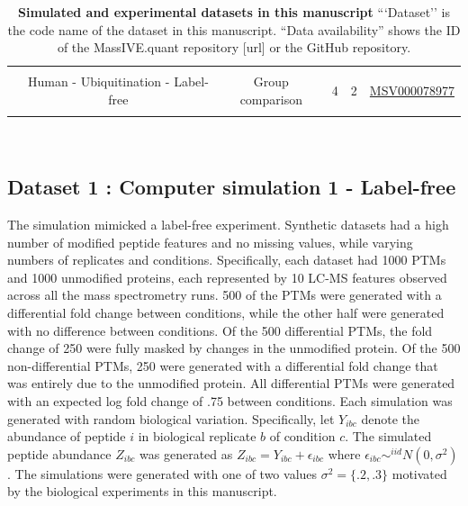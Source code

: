 \documentclass[mcp]{article}
\numberwithin{table}{section}
\def\todo#1{{\color{red}[#1]}}
\begin{document}
\begin{table}[h!]
\begin{tiny}
\begin{tabular}{|c|c|ccc|c|}
&&&&& \\%
& Human - Ubiquitination - Label-free & Group comparison & 4 & 2 & \href{https://massive.ucsd.edu/ProteoSAFe/dataset.jsp?task=1b516164de5345108b40b75147dd58b5}{MSV000078977}\\ [0.02in]
 &&&&& \\
 \hline
\end{tabular}\\
\end{tiny}
\caption{ \small {\bf Simulated and experimental datasets in this manuscript} 
```Dataset'' is the code name of the dataset in this manuscript.
``Data availability'' shows the ID of the MassIVE.quant repository \todo{url} or the GitHub repository. 
}
\label{tab:dataDescription}
\end{table}

\subsection*{Dataset 1 : Computer simulation 1 - Label-free}
\label{sec:comp_sim_procedure1}

The simulation mimicked a label-free experiment. Synthetic datasets had a high number of modified peptide features and no missing values, while varying numbers of replicates and conditions. Specifically, each dataset had 1000 PTMs and 1000 unmodified proteins, each represented by 10 LC-MS features observed across all the mass spectrometry runs. 500 of the PTMs were generated with a differential fold change between conditions, while the other half were generated with no difference between conditions. Of the 500 differential PTMs, the fold change of 250 were fully masked by changes in the unmodified protein. Of the 500 non-differential PTMs, 250 were generated with a differential fold change that was entirely due to the unmodified protein. All differential PTMs were generated with an expected log fold change of .75 between conditions. Each simulation was generated with random biological variation. Specifically, let $Y_{ibc}$ denote the abundance of peptide $i$ in biological replicate $b$ of condition $c$. The simulated peptide abundance  $Z_{ibc}$ was generated as $Z_{ibc} = Y_{ibc} + \epsilon_{ibc}$ where $\epsilon_{ibc}\sim^{iid}N(0,\sigma^2)$. The simulations were generated with one of two values $\sigma^2 = \{.2, .3\}$ motivated by the biological experiments in this manuscript.
\end{document}
